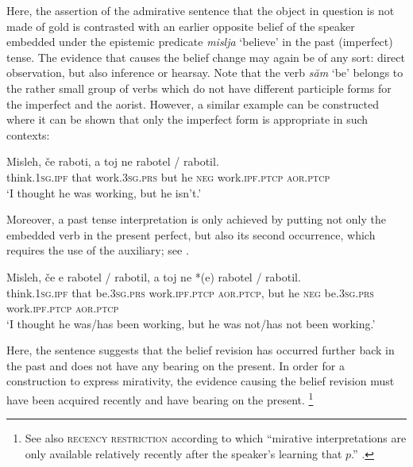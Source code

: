 \documentclass[output=paper]{langscibook}
\begin{document}
\noindent Here, the assertion of the admirative sentence that the object in question is not made of gold is contrasted with an earlier opposite belief of the speaker embedded under the epistemic predicate \textit{mislja} `believe' in the past (imperfect) tense. The evidence that causes the belief change may again be of any sort: direct observation, but also inference or hearsay. Note that the verb \textit{săm} `be' belongs to the rather small group of verbs which do not have different participle forms for the imperfect and the aorist. However, a similar example can be constructed where it can be shown that only the imperfect form is appropriate in such contexts:

\ea \label{ex:misleh2}
\gll Misleh, če raboti, a toj ne rabotel / \minsp{*} rabotil. \\
think.\textsc{1sg.ipf} that work.\textsc{3sg.prs} but he \textsc{neg} work.\textsc{ipf.ptcp} {} {} \textsc{aor.ptcp} \\
\glt `I thought he was working, but he isn't.'
\z

\noindent Moreover, a past tense interpretation is only achieved by putting not only the embedded verb in the present perfect, but also its second occurrence, which requires the use of the auxiliary; see .

\ea \label{ex:misleh3}
\gll Misleh, če e rabotel / rabotil, a toj ne *(e) rabotel / rabotil. \\
think.\textsc{1sg.ipf} that be.\textsc{3sg.prs} work.\textsc{ipf.ptcp} {} \textsc{aor.ptcp}, but he \textsc{neg} \phantom{*(}be.\textsc{3sg.prs} work.\textsc{ipf.ptcp} {} \textsc{aor.ptcp} \\
\glt `I thought he was/has been working, but he was not/has not been working.'
\z

\noindent Here, the sentence suggests that the belief revision has occurred further back in the past and does not have any bearing on the present. In order for a construction to express mirativity, the evidence causing the belief revision must have been acquired recently and have bearing on the present.%
\footnote{See also  \textsc{recency restriction} according to which ``mirative interpretations are only available relatively recently after the speaker's learning that $p$.'' \citep[464]{Rett.Murray2013}.}
\end{document}
